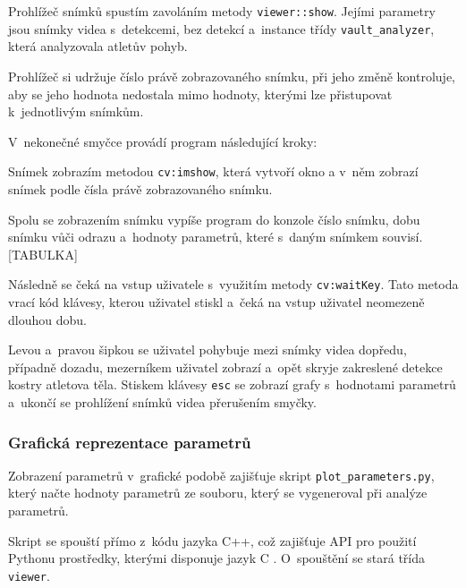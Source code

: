 Prohlížeč snímků spustím zavoláním metody \texttt{viewer::show}. Jejími parametry jsou snímky videa s~detekcemi, bez detekcí a~instance třídy \texttt{vault\_analyzer}, která analyzovala atletův pohyb.

Prohlížeč si udržuje číslo právě zobrazovaného snímku, při jeho změně kontroluje, aby se jeho hodnota nedostala mimo hodnoty, kterými lze přistupovat k~jednotlivým snímkům.

V~nekonečné smyčce provádí program následující kroky:

Snímek zobrazím metodou \texttt{cv\::imshow}, která vytvoří okno a v~něm zobrazí snímek podle čísla právě zobrazovaného snímku.

Spolu se zobrazením snímku vypíše program do konzole číslo snímku, dobu snímku vůči odrazu a~hodnoty parametrů, které s~daným snímkem souvisí. [TABULKA]

Následně se čeká na vstup uživatele s~využitím metody \texttt{cv\::waitKey}. Tato metoda vrací kód klávesy, kterou uživatel stiskl a~čeká na vstup uživatel neomezeně dlouhou dobu.

Levou a~pravou šipkou se uživatel pohybuje mezi snímky videa dopředu, případně dozadu, mezerníkem uživatel zobrazí a~opět skryje zakreslené detekce kostry atletova těla. Stiskem klávesy \texttt{esc} se zobrazí grafy s~hodnotami parametrů a~ukončí se prohlížení snímků videa přerušením smyčky.


\subsubsection{Grafická reprezentace parametrů}

Zobrazení parametrů v~grafické podobě zajišťuje skript \texttt{plot\_parameters.py}, který načte hodnoty parametrů ze souboru, který se vygeneroval při analýze parametrů.

Skript se spouští přímo z~kódu jazyka C++, což zajišťuje API pro použití Pythonu prostředky, kterými disponuje jazyk C \citep{PythonC}. O~spouštění se stará třída \texttt{viewer}.

